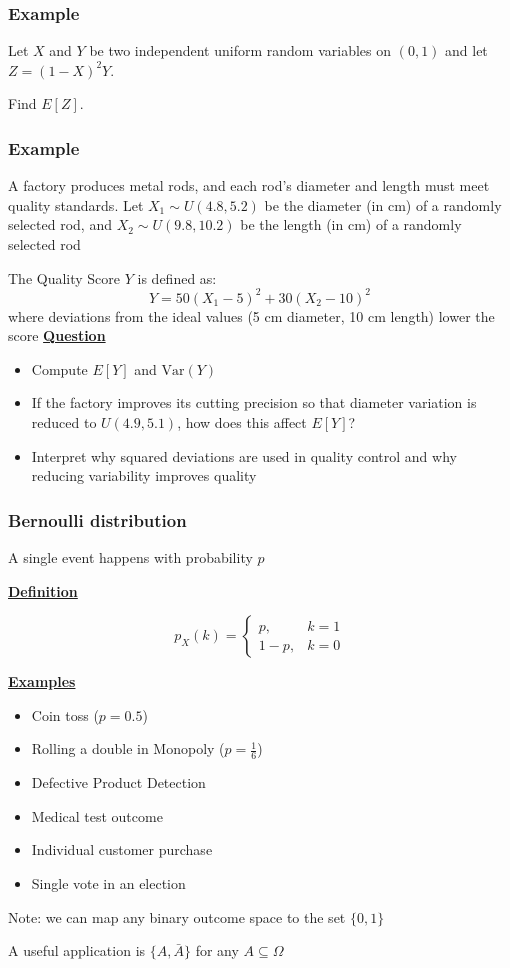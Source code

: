 \documentclass[t,8pt]{beamer}%
\begin{document}
\begin{frame}
\frametitle{Example}
Let $X$ and $Y$ be two independent uniform random variables on $(0,1)$ and let $Z=(1-X)^2Y$. \par
Find $E[Z]$.
\end{frame}

\begin{frame}
\frametitle{Example}
A factory produces metal rods, and each rod’s diameter and length must meet quality standards. Let $X_1 \sim U(4.8, 5.2)$ be the diameter (in cm) of a randomly selected rod, and $X_2 \sim U(9.8, 10.2)$ be the length (in cm) of a randomly selected rod \par
The Quality Score \( Y \) is defined as:
\[
Y = 50 \left( X_1 - 5 \right)^2 + 30 \left( X_2 - 10 \right)^2
\]
where deviations from the ideal values (5 cm diameter, 10 cm length) lower the score
{\bf\underline{Question}}
\begin{itemize}
    \item[(a)] Compute \( E[Y] \) and \( \text{Var}(Y) \)
    \item[(b)] If the factory improves its cutting precision so that diameter variation is reduced to \( U(4.9, 5.1) \), how does this affect \( E[Y] \)?
    \item[(c)] Interpret why squared deviations are used in quality control and why reducing variability improves quality
\end{itemize}
\end{frame}

\begin{frame}
		\frametitle{Bernoulli distribution}
		A single event happens with probability $p$ \par
		
		{\bf\underline{Definition}} \par
		$$
		p_X(k) = \left\{\begin{array}{lr}
			p, & k=1\\
			1-p, & k=0
		\end{array}\right.
		$$
		
		{\bf\underline{Examples}}
		\begin{itemize}
			\item Coin toss ($p=0.5$)
			\item Rolling a double in Monopoly ($p=\frac 16$)
			\item Defective Product Detection
			\item Medical test outcome
			\item Individual customer purchase
			\item Single vote in an election
		\end{itemize}
	Note: we can map any binary outcome space to the set $\{0,1\}$ \par
        A useful application is $\{A,\bar A\}$ for any $A\subseteq\Omega$
	\end{frame}
	
\end{document}
